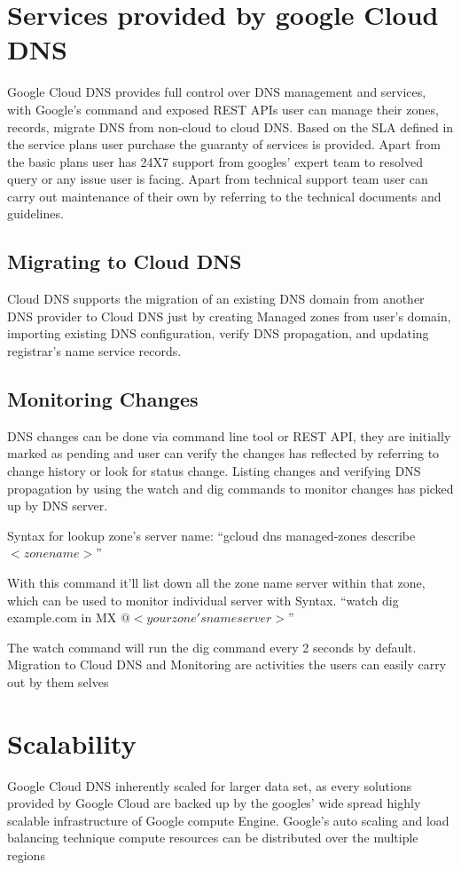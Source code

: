 \documentclass[9pt,twocolumn,twoside]{styles/osajnl}
\begin{document}
\cite{dns-overview}
\section{Services provided by google Cloud DNS}
Google Cloud DNS provides full control over DNS management and services, with Google’s command and exposed REST APIs user can manage their zones, records, migrate DNS from non-cloud to cloud DNS. Based on the SLA defined in the service plans user purchase the guaranty of services is provided. Apart from the basic plans user has 24X7 support from googles’ expert team to resolved query or any issue user is facing. Apart from technical support team user can carry out maintenance of their own by referring to the technical documents and guidelines. 

\subsection{Migrating to Cloud DNS}
Cloud DNS supports the migration of an existing DNS domain from another DNS provider to Cloud DNS just by creating Managed zones from user’s domain, importing existing DNS configuration, verify DNS propagation, and updating registrar’s name service records.

\subsection{Monitoring Changes}
DNS changes can be done via command line tool or REST API, they are initially marked as pending and user can verify the changes has reflected by referring to change history or look for status change. Listing changes and verifying DNS propagation by using the watch and dig commands to monitor changes has picked up by DNS server. 

Syntax for lookup zone’s server name:
“gcloud dns managed-zones describe $<zone name>$”\cite{dns-zne}

With this command it’ll list down all the zone name server within that zone, which can be used to monitor individual server with Syntax.
“watch dig example.com in MX $@<your zone's nameserver>$”\cite{dns-zne}

The watch command will run the dig command every 2 seconds by default.
Migration to Cloud DNS and Monitoring are activities the users can easily carry out by them selves 

\section{Scalability}
Google Cloud DNS inherently scaled for larger data set, as every solutions provided by Google Cloud are backed up by the googles’ wide spread highly scalable infrastructure of Google compute Engine. Google’s auto scaling and load balancing technique compute resources can be distributed over the multiple regions 
\end{document}
